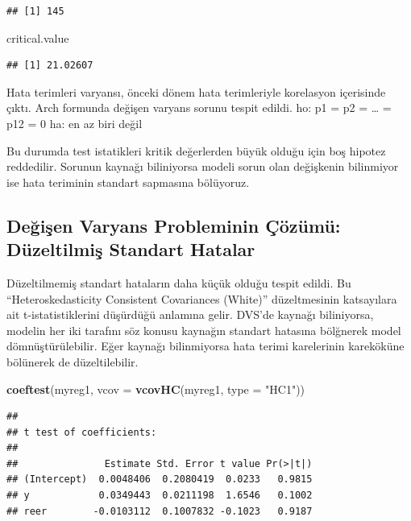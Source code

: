 \documentclass[]{article}
\newenvironment{Shaded}{\begin{snugshade}}{\end{snugshade}}
\newcommand{\KeywordTok}[1]{\textcolor[rgb]{0.13,0.29,0.53}{\textbf{#1}}}
\newcommand{\DataTypeTok}[1]{\textcolor[rgb]{0.13,0.29,0.53}{#1}}
\newcommand{\StringTok}[1]{\textcolor[rgb]{0.31,0.60,0.02}{#1}}
\newcommand{\NormalTok}[1]{#1}
\begin{document}
\begin{verbatim}
## [1] 145
\end{verbatim}

\begin{Shaded}
\begin{Highlighting}[]
\NormalTok{critical.value}
\end{Highlighting}
\end{Shaded}

\begin{verbatim}
## [1] 21.02607
\end{verbatim}

Hata terimleri varyansı, önceki dönem hata terimleriyle korelasyon
içerisinde çıktı. Arch formunda değişen varyans sorunu tespit edildi.
ho: p1 = p2 = \ldots{} = p12 = 0 ha: en az biri değil

Bu durumda test istatikleri kritik değerlerden büyük olduğu için boş
hipotez reddedilir. Sorunun kaynağı biliniyorsa modeli sorun olan
değişkenin bilinmiyor ise hata teriminin standart sapmasına bölüyoruz.

\subsection{Değişen Varyans Probleminin Çözümü: Düzeltilmiş Standart
Hatalar}\label{degisen-varyans-probleminin-cozumu-duzeltilmis-standart-hatalar}

Düzeltilmemiş standart hataların daha küçük olduğu tespit edildi. Bu
``Heteroskedasticity Consistent Covariances (White)'' düzeltmesinin
katsayılara ait t-istatistiklerini düşürdüğü anlamına gelir. DVS'de
kaynağı biliniyorsa, modelin her iki tarafını söz konusu kaynağın
standart hatasına bölğnerek model dömnüştürülebilir. Eğer kaynağı
bilinmiyorsa hata terimi karelerinin kareköküne bölünerek de
düzeltilebilir.

\begin{Shaded}
\begin{Highlighting}[]
\KeywordTok{coeftest}\NormalTok{(myreg1, }\DataTypeTok{vcov =} \KeywordTok{vcovHC}\NormalTok{(myreg1, }\DataTypeTok{type =} \StringTok{"HC1"}\NormalTok{))}
\end{Highlighting}
\end{Shaded}

\begin{verbatim}
## 
## t test of coefficients:
## 
##               Estimate Std. Error t value Pr(>|t|)
## (Intercept)  0.0048406  0.2080419  0.0233   0.9815
## y            0.0349443  0.0211198  1.6546   0.1002
## reer        -0.0103112  0.1007832 -0.1023   0.9187
\end{verbatim}
\end{document}
